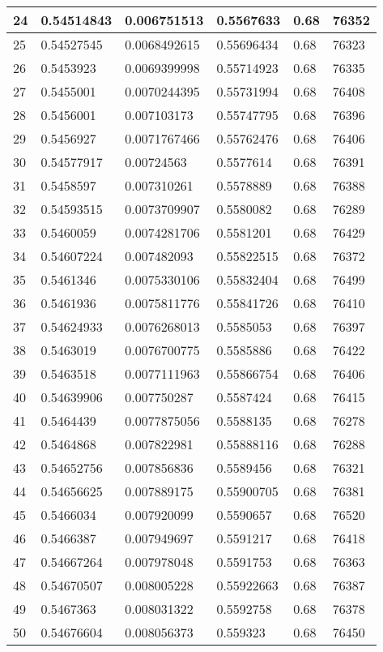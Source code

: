\begin{longtable}{|l|l|l|l|l|l|}
24 & 0.54514843 & 0.006751513 & 0.5567633 & 0.68 & 76352 \\ \hline 
25 & 0.54527545 & 0.0068492615 & 0.55696434 & 0.68 & 76323 \\ \hline 
26 & 0.5453923 & 0.0069399998 & 0.55714923 & 0.68 & 76335 \\ \hline 
27 & 0.5455001 & 0.0070244395 & 0.55731994 & 0.68 & 76408 \\ \hline 
28 & 0.5456001 & 0.007103173 & 0.55747795 & 0.68 & 76396 \\ \hline 
29 & 0.5456927 & 0.0071767466 & 0.55762476 & 0.68 & 76406 \\ \hline 
30 & 0.54577917 & 0.00724563 & 0.5577614 & 0.68 & 76391 \\ \hline 
31 & 0.5458597 & 0.007310261 & 0.5578889 & 0.68 & 76388 \\ \hline 
32 & 0.54593515 & 0.0073709907 & 0.5580082 & 0.68 & 76289 \\ \hline 
33 & 0.5460059 & 0.0074281706 & 0.5581201 & 0.68 & 76429 \\ \hline 
34 & 0.54607224 & 0.007482093 & 0.55822515 & 0.68 & 76372 \\ \hline 
35 & 0.5461346 & 0.0075330106 & 0.55832404 & 0.68 & 76499 \\ \hline 
36 & 0.5461936 & 0.0075811776 & 0.55841726 & 0.68 & 76410 \\ \hline 
37 & 0.54624933 & 0.0076268013 & 0.5585053 & 0.68 & 76397 \\ \hline 
38 & 0.5463019 & 0.0076700775 & 0.5585886 & 0.68 & 76422 \\ \hline 
39 & 0.5463518 & 0.0077111963 & 0.55866754 & 0.68 & 76406 \\ \hline 
40 & 0.54639906 & 0.007750287 & 0.5587424 & 0.68 & 76415 \\ \hline 
41 & 0.5464439 & 0.0077875056 & 0.5588135 & 0.68 & 76278 \\ \hline 
42 & 0.5464868 & 0.007822981 & 0.55888116 & 0.68 & 76288 \\ \hline 
43 & 0.54652756 & 0.007856836 & 0.5589456 & 0.68 & 76321 \\ \hline 
44 & 0.54656625 & 0.007889175 & 0.55900705 & 0.68 & 76381 \\ \hline 
45 & 0.5466034 & 0.007920099 & 0.5590657 & 0.68 & 76520 \\ \hline 
46 & 0.5466387 & 0.007949697 & 0.5591217 & 0.68 & 76418 \\ \hline 
47 & 0.54667264 & 0.007978048 & 0.5591753 & 0.68 & 76363 \\ \hline 
48 & 0.54670507 & 0.008005228 & 0.55922663 & 0.68 & 76387 \\ \hline 
49 & 0.5467363 & 0.008031322 & 0.5592758 & 0.68 & 76378 \\ \hline 
50 & 0.54676604 & 0.008056373 & 0.559323 & 0.68 & 76450 \\ \hline 
\end{longtable}